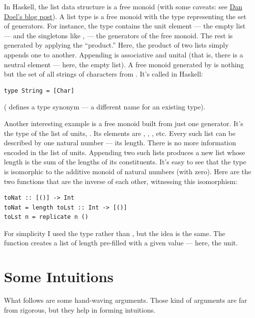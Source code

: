 In Haskell, the list data structure is a free monoid (with some caveats:
see \href{http://comonad.com/reader/2015/free-monoids-in-haskell/}{Dan
Doel's blog post}). A list type \code{{[}a{]}} is a free monoid with
the type  representing the set of generators. For instance,
the type \code{{[}Char{]}} contains the unit element --- the empty
list \code{{[}{]}} --- and the singletons like
\code{{[}'a'{]}}, \code{{[}'b'{]}} --- the
generators of the free monoid. The rest is generated by applying the
``product.'' Here, the product of two lists simply appends one to
another. Appending is associative and unital (that is, there is a
neutral element --- here, the empty list). A free monoid generated by
 is nothing but the set of all strings of characters from
. It's called  in Haskell:

\begin{verbatim}
type String = [Char]
\end{verbatim}
( defines a type synonym --- a different name for an
existing type).

Another interesting example is a free monoid built from just one
generator. It's the type of the list of units, \code{{[}(){]}}. Its
elements are \code{{[}{]}}, \code{{[}(){]}}, \code{{[}(), (){]}},
etc. Every such list can be described by one natural number --- its
length. There is no more information encoded in the list of units.
Appending two such lists produces a new list whose length is the sum of
the lengths of its constituents. It's easy to see that the type
\code{{[}(){]}} is isomorphic to the additive monoid of natural
numbers (with zero). Here are the two functions that are the inverse of
each other, witnessing this isomorphism:

\begin{verbatim}
toNat :: [()] -> Int
toNat = length toLst :: Int -> [()]
toLst n = replicate n ()
\end{verbatim}
For simplicity I used the type  rather than
, but the idea is the same. The function
 creates a list of length  pre-filled with a
given value --- here, the unit.

\section{Some Intuitions}\label{some-intuitions}

What follows are some hand-waving arguments. Those kind of arguments are
far from rigorous, but they help in forming intuitions.

